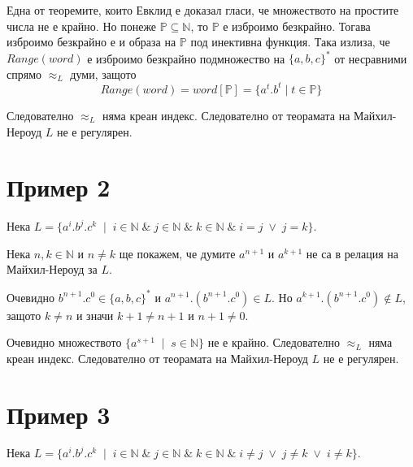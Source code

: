 \documentclass[12pt]{article}
\begin{document}
\vspace*{3mm}

\par Една от теоремите, които Евклид е доказал гласи, че множеството на простите числа не е крайно.
Но понеже \(\mathbb P \subseteq \mathbb N\), то \(\mathbb P\) е изброимо безкрайно.
Тогава изброимо безкрайно е и образа на \(\mathbb P\) под инективна функция.
Така излиза, че \(Range(word)\) е изброимо безкрайно подмножество на \(\{a, b, c\}^*\) от несравними спрямо \(\approx_L\) думи, защото \[Range(word) = word[\mathbb P] = \{a^t.b^t \mid t \in \mathbb P\}\]

Следователно \(\approx_L\) няма креан индекс. Следователно от теорамата на Майхил-Нероуд \(L\) не е регулярен.

\section{Пример 2}
Нека \(L = \{a^i.b^j.c^k \;\mid\; i \in \mathbb{N} \;\&\; j \in \mathbb{N} \;\&\; k \in \mathbb{N} \;\&\; i = j \;\lor\; j = k\}\).

\vspace*{5mm}

\par Нека \(n, k \in \mathbb{N}\) и \(n \neq k\) ще покажем, че думите \(a^{n + 1}\) и \(a^{k + 1}\) не са в релация на Майхил-Нероуд за \(L\).

\vspace*{5mm}

\par Очевидно \(b^{n + 1}.c^0 \in \{a, b, c\}^*\) и \(a^{n + 1}.(b^{n + 1}.c^0 )\in L\).
Но \(a^{k + 1}.(b^{n + 1}.c^0) \notin L\), защото \(k \neq n\) и значи \(k + 1 \neq n + 1\) и \(n + 1 \neq 0\).

\vspace*{5mm}

\par Очевидно множеството \(\{a^{s + 1} \;\mid\; s \in \mathbb{N}\}\) не е крайно.
Следователно \(\approx_L\) няма креан индекс. Следователно от теорамата на Майхил-Нероуд \(L\) не е регулярен.

\section{Пример 3}
Нека \(L = \{a^i.b^j.c^k \;\mid\; i \in \mathbb{N} \;\&\; j \in \mathbb{N} \;\&\; k \in \mathbb{N} \;\&\; i \neq j \;\lor\; j \neq k \;\lor\; i \neq k\}\).

\vspace*{5mm}
\end{document}
